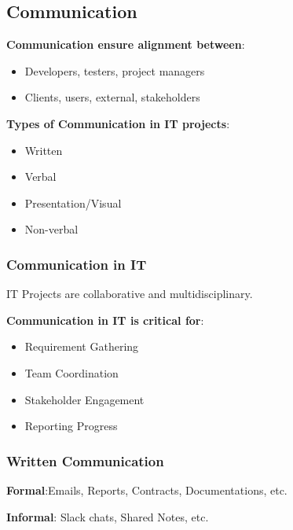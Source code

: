 \subsection{Communication}

\indent 

\noindent\textbf{Communication ensure alignment between}:

\begin{itemize}
    \item Developers, testers, project managers
    \item Clients, users, external, stakeholders
\end{itemize}

\bigskip

\noindent\textbf{Types of Communication in IT projects}:

\begin{itemize}
    \item Written
    \item Verbal
    \item Presentation/Visual
    \item Non-verbal
\end{itemize}

\subsubsection{Communication in IT}

\indent 

IT Projects are collaborative and multidisciplinary.

\noindent\textbf{Communication in IT is critical for}:

\begin{itemize}
    \item Requirement Gathering
    \item Team Coordination
    \item Stakeholder Engagement
    \item Reporting Progress
\end{itemize}

\subsubsection{Written Communication}

\indent 

\noindent\textbf{Formal}:Emails, Reports, Contracts, Documentations, etc.

\noindent\textbf{Informal}: Slack chats, Shared Notes, etc.

